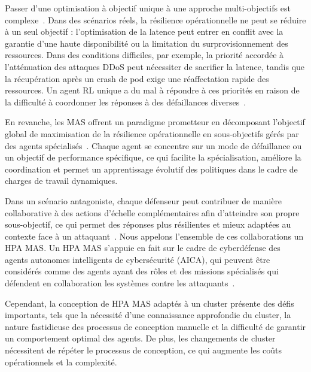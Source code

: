 Passer d'une optimisation à objectif unique à une approche multi-objectifs est complexe~\cite{Shoham2009MAS}. Dans des scénarios réels, la résilience opérationnelle ne peut se réduire à un seul objectif : l'optimisation de la latence peut entrer en conflit avec la garantie d'une haute disponibilité ou la limitation du surprovisionnement des ressources. Dans des conditions difficiles, par exemple, la priorité accordée à l'atténuation des attaques DDoS peut nécessiter de sacrifier la latence, tandis que la récupération après un crash de pod exige une réaffectation rapide des ressources. Un agent RL unique a du mal à répondre à ces priorités en raison de la difficulté à coordonner les réponses à des défaillances diverses~\cite{Jennings1998}.

En revanche, les MAS offrent un paradigme prometteur en décomposant l'objectif global de maximisation de la résilience opérationnelle en sous-objectifs gérés par des agents spécialisés~\cite{Shoham2009MAS}. Chaque agent se concentre sur un mode de défaillance ou un objectif de performance spécifique, ce qui facilite la spécialisation, améliore la coordination et permet un apprentissage évolutif des politiques dans le cadre de charges de travail dynamiques.

Dans un scénario antagoniste, chaque défenseur peut contribuer de manière collaborative à des actions d'échelle complémentaires afin d'atteindre son propre sous-objectif, ce qui permet des réponses plus résilientes et mieux adaptées au contexte face à un attaquant~\cite{Jennings1998}. Nous appelons l'ensemble de ces collaborations un HPA MAS. Un HPA MAS s'appuie en fait sur le cadre de cyberdéfense des agents autonomes intelligents de cybersécurité (AICA), qui peuvent être considérés comme des agents ayant des rôles et des missions spécialisés qui défendent en collaboration les systèmes contre les attaquants~\cite{Kott2018}.

Cependant, la conception de HPA MAS adaptés à un cluster présente des défis importants, tels que la nécessité d'une connaissance approfondie du cluster, la nature fastidieuse des processus de conception manuelle et la difficulté de garantir un comportement optimal des agents. De plus, les changements de cluster nécessitent de répéter le processus de conception, ce qui augmente les coûts opérationnels et la complexité.

